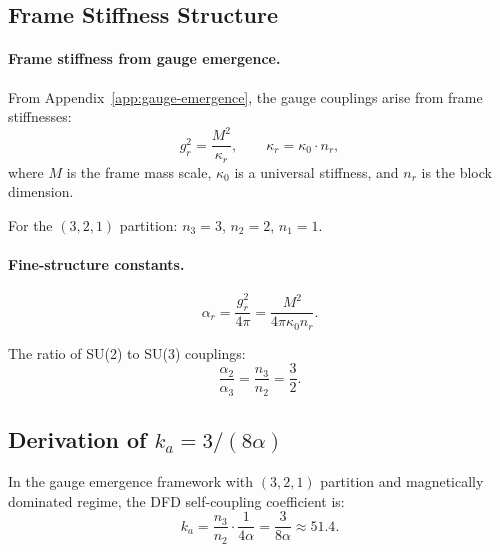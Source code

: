 \subsection{Frame Stiffness Structure}\label{app:frame-stiffness}

\paragraph{Frame stiffness from gauge emergence.}
From Appendix~\ref{app:gauge-emergence}, the gauge couplings arise from frame stiffnesses:
\begin{equation}
g_r^2 = \frac{M^2}{\kappa_r}, \qquad \kappa_r = \kappa_0 \cdot n_r,
\end{equation}
where $M$ is the frame mass scale, $\kappa_0$ is a universal stiffness, and $n_r$ is the block dimension.

For the $(3,2,1)$ partition: $n_3 = 3$, $n_2 = 2$, $n_1 = 1$.

\paragraph{Fine-structure constants.}
\begin{equation}
\alpha_r = \frac{g_r^2}{4\pi} = \frac{M^2}{4\pi\kappa_0 n_r}.
\end{equation}

The ratio of SU(2) to SU(3) couplings:
\begin{equation}
\frac{\alpha_2}{\alpha_3} = \frac{n_3}{n_2} = \frac{3}{2}.
\end{equation}

\subsection{Derivation of $k_a = 3/(8\alpha)$}\label{app:ka-derivation}

\begin{theorem}\label{thm:ka}
In the gauge emergence framework with $(3,2,1)$ partition and magnetically dominated regime, the DFD self-coupling coefficient is:
\begin{equation}
k_a = \frac{n_3}{n_2} \cdot \frac{1}{4\alpha} = \frac{3}{8\alpha} \approx 51.4.
\end{equation}
\end{theorem}

